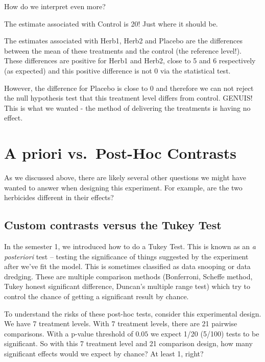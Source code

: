 \documentclass[
]{book}
\begin{document}
How do we interpret even more?

The estimate associated with Control is 20! Just where it should be.

The estimates associated with Herb1, Herb2 and Placebo are the differences between the mean of these treatments and the control (the reference level!). These differences are positive for Herb1 and Herb2, close to 5 and 6 respectively (as expected) and this positive difference is not 0 via the statistical test.

However, the difference for Placebo is close to 0 and therefore we can not reject the null hypothesis test that this treatment level differs from control. GENUIS! This is what we wanted - the method of delivering the treatments is having no effect.

\hypertarget{a-priori-vs.-post-hoc-contrasts}{%
\section{A priori vs.~Post-Hoc Contrasts}\label{a-priori-vs.-post-hoc-contrasts}}

As we discussed above, there are likely several other questions we might have wanted to answer when designing this experiment. For example, are the two herbicides different in their effects?

\hypertarget{custom-contrasts-versus-the-tukey-test}{%
\subsection{Custom contrasts versus the Tukey Test}\label{custom-contrasts-versus-the-tukey-test}}

In the semester 1, we introduced how to do a Tukey Test. This is known as an \emph{a posteriori} test -- testing the significance of things suggested by the experiment after we've fit the model. This is sometimes classified as data snooping or data dredging. These are multiple comparison methods (Bonferroni, Scheffe method, Tukey honest significant difference, Duncan's multiple range test) which try to control the chance of getting a significant result by chance.

To understand the risks of these post-hoc tests, consider this experimental design. We have 7 treatment levels. With 7 treatment levels, there are 21 pairwise comparisons. With a p-value threshold of \(0.05\) we expect 1/20 (5/100) tests to be significant. So with this 7 treatment level and 21 comparison design, how many significant effects would we expect by chance? At least 1, right?
\end{document}
